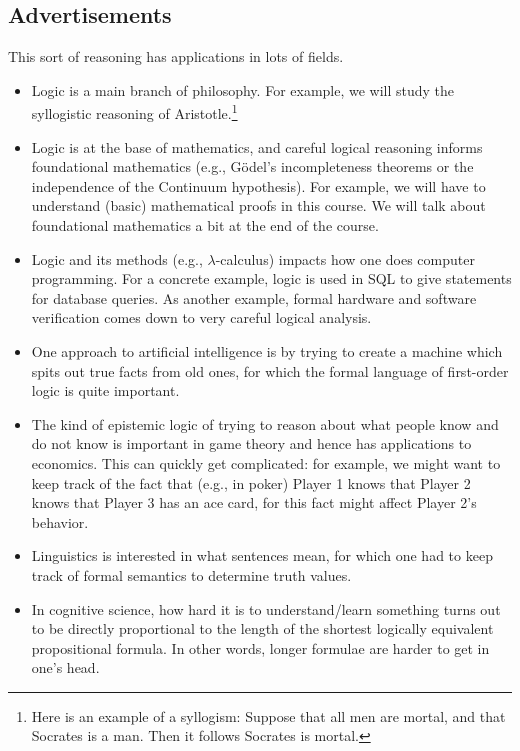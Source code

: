 \subsection{Advertisements}
This sort of reasoning has applications in lots of fields.
\begin{itemize}
	\item Logic is a main branch of philosophy. For example, we will study the syllogistic reasoning of Aristotle.\footnote{Here is an example of a syllogism: Suppose that all men are mortal, and that Socrates is a man. Then it follows Socrates is mortal.}
	\item Logic is at the base of mathematics, and careful logical reasoning informs foundational mathematics (e.g., G\"odel's incompleteness theorems or the independence of the Continuum hypothesis). For example, we will have to understand (basic) mathematical proofs in this course. We will talk about foundational mathematics a bit at the end of the course.
	\item Logic and its methods (e.g., $\lambda$-calculus) impacts how one does computer programming. For a concrete example, logic is used in SQL to give statements for database queries. As another example, formal hardware and software verification comes down to very careful logical analysis.
	\item One approach to artificial intelligence is by trying to create a machine which spits out true facts from old ones, for which the formal language of first-order logic is quite important.
	\item The kind of epistemic logic of trying to reason about what people know and do not know is important in game theory and hence has applications to economics. This can quickly get complicated: for example, we might want to keep track of the fact that (e.g., in poker) Player 1 knows that Player 2 knows that Player 3 has an ace card, for this fact might affect Player 2's behavior.
	\item Linguistics is interested in what sentences mean, for which one had to keep track of formal semantics to determine truth values.
	\item In cognitive science, how hard it is to understand/learn something turns out to be directly proportional to the length of the shortest logically equivalent propositional formula. In other words, longer formulae are harder to get in one's head.
\end{itemize}

